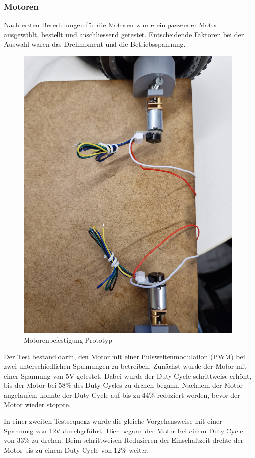 \subsubsection{Motoren}

Nach ersten Berechnungen für die Motoren wurde ein passender Motor ausgewählt, bestellt und anschliessend getestet. Entscheidende Faktoren bei der Auswahl waren das Drehmoment und die Betriebsspannung.


\begin{figure}[H]
    \centering
    \includegraphics[width=0.8\linewidth]{img/Motorenaufbau.jpg}
    \caption{Motorenbefestigung Prototyp}
    \label{fig:Motorenaufbau}
\end{figure}


Der Test bestand darin, den Motor mit einer Pulsweitenmodulation (PWM) bei zwei unterschiedlichen Spannungen zu betreiben. Zunächst wurde der Motor mit einer Spannung von 5V getestet. Dabei wurde der Duty Cycle schrittweise erhöht, bis der Motor bei 58\% des Duty Cycles zu drehen begann. Nachdem der Motor angelaufen, konnte der Duty Cycle auf bis zu 44\% reduziert werden, bevor der Motor wieder stoppte.


In einer zweiten Testsequenz wurde die gleiche Vorgehensweise mit einer Spannung von 12V durchgeführt. Hier begann der Motor bei einem Duty Cycle von 33\% zu drehen. Beim schrittweisen Reduzieren der Einschaltzeit drehte der Motor bis zu einem Duty Cycle von 12\% weiter.

